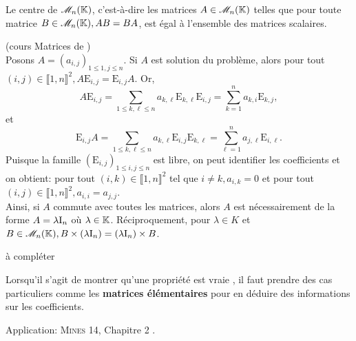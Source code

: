 \begin{prop}
Le centre de $\mathscr{M}_n(\mathbb{K})$, c'est-à-dire les matrices $A \in \mathscr{M}_n(\mathbb{K})$ telles que pour toute matrice $B \in \mathscr{M}_n(\mathbb{K}), AB = BA$, est égal à l'ensemble des matrices scalaires.
\end{prop}


\begin{preuve}
    (cours Matrices de \cite{maths-france})\\
    Posons $A = (a_{i,j})_{1 \leqslant 1, j \leqslant n}$. Si $A$ est solution du problème, alors pour tout $(i, j) \in \llbracket 1, n \rrbracket^2, A \mathrm{E}_{i,j} = \mathrm{E}_{i,j} A$. Or,
    $$A \mathrm{E}_{i,j} = \sum_{1 \leqslant k, \ell \leqslant n} a_{k, \ell} \mathrm{E}_{k,\ell} \mathrm{E}_{i,j} = \sum_{k=1}^{n} a_{k,i} \mathrm{E}_{k,j},$$
    et
    $$\mathrm{E}_{i,j} A = \sum_{1 \leqslant k, \ell \leqslant n} a_{k, \ell} \mathrm{E}_{i,j} \mathrm{E}_{k,\ell} = \sum_{\ell=1}^{n} a_{j,\ell} \mathrm{E}_{i,\ell}.$$
    Puisque la famille $(\mathrm{E}_{i, j})_{1 \leqslant i, j \leqslant n}$ est libre, on peut identifier les coefficients et on obtient: pour tout $(i, k) \in \llbracket 1, n \rrbracket^2$ tel que $i \not= k, a_{i,k}=0$ et pour tout $(i,j) \in \llbracket 1, n \rrbracket^2, a_{i,i}=a_{j,j}$. \\
    Ainsi, si $A$ commute avec toutes les matrices, alors $A$ est nécessairement de la forme $A = \lambda \mathrm{I}_n$ où $\lambda \in \mathbb{K}$. Réciproquement, pour $\lambda \in K$ et $B \in \mathscr{M}_n(\mathbb{K}), B \times (\lambda \mathrm{I}_n) = (\lambda \mathrm{I}_n) \times B$.
\end{preuve}

\begin{marginfigure}
à compléter
\end{marginfigure}

\begin{methode}
    Lorsqu'il s'agit de montrer qu'une propriété est vraie , il faut prendre des cas particuliers comme les \textbf{matrices élémentaires} pour en déduire des informations sur les coefficients.
\end{methode}

Application: \textsc{Mines 14}, Chapitre 2 \cite{exos_oraux}. 
